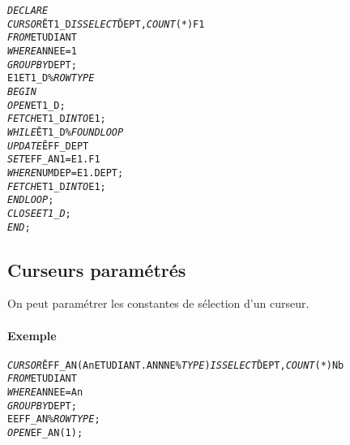 \documentclass[10pt]{article}
\begin{document}
				\begin{alltt}
					\begin{tabbing}
						\emph{DECLARE}\=\\
							\>\emph{CURSOR} \= ET1_D \emph{IS} \=\emph{SELECT} \=DEPT, \emph{COUNT}(*) F1\\
									\>\>\emph{FROM}\>ETUDIANT\\
									\>\>\emph{WHERE}\>ANNEE=1\\
									\>\>\emph{GROUP BY} DEPT;\\
							\>E1\>ET1_D\%\emph{ROWTYPE}\\
						\emph{BEGIN}\\
							\>\emph{OPEN} ET1_D;\\
							\>\emph{FETCH} ET1_D \emph{INTO} E1;\\
							\>\emph{WHILE} \= ET1_D\%\emph{FOUND LOOP}\\
								\>\>\emph{UPDATE} \=EFF_DEPT\\
								\>\>\>\emph{SET}\>EFF_AN1=E1.F1\\
								\>\>\>\emph{WHERE}\>NUMDEP=E1.DEPT;\\
								\>\>\emph{FETCH} ET1_D \emph{INTO} E1;\\
							\>\emph{END LOOP};
							\>\emph{CLOSE ET1_D};
						\emph{END};
					\end{tabbing}
				\end{alltt}

		\subsection{Curseurs paramétrés}
			On peut paramétrer les constantes de sélection d'un curseur.
			
			\paragraph{Exemple}
				\begin{alltt}
					\begin{tabbing}
						\emph{CURSOR} \=EFF_AN(An ETUDIANT.ANNNE\%\emph{TYPE}) \emph{IS} \=\emph{SELECT} \=DEPT, \emph{COUNT}(*) Nb\\
									\>\emph{FROM}\>ETUDIANT\\
									\>\emph{WHERE}\>ANNEE=An\\
									\>\emph{GROUP BY} DEPT;\\
						E \>EFF_AN\%\emph{ROWTYPE};\\
						\emph{OPEN} \>EF_AN(1);
					\end{tabbing}
				\end{alltt}
				
\end{document}
